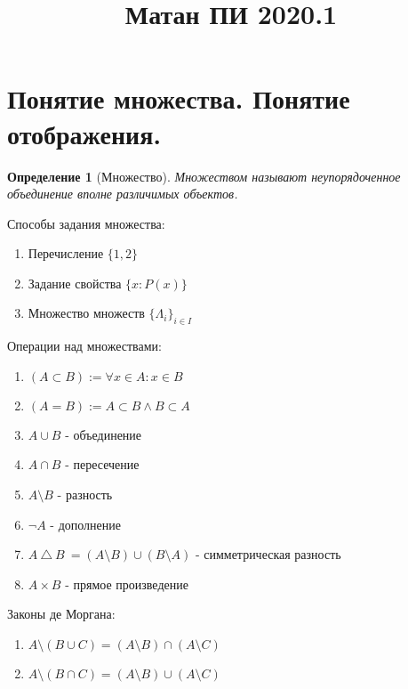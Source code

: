 \documentclass[11pt,a4paper,titlepage]{article}
\title{Матан ПИ 2020.1}
\author{}
\newtheorem*{definition}{Определение}
\begin{document}
    \onehalfspacing

    \maketitle
    \tableofcontents


    \section{Понятие множества. Понятие отображения.}

    \begin{definition}[Множество]
        Множеством называют неупорядоченное объединение вполне различимых объектов.
    \end{definition}

    \bigskip

    Способы задания множества:
    \begin{enumerate}
        \item Перечисление \(\{1, 2\}\)
        \item Задание свойства \(\{x : P(x)\}\)
        \item Множество множеств \(\{\Lambda_i\}_{i \in I}\)
    \end{enumerate}

    \bigskip

    Операции над множествами:
    \begin{enumerate}
        \item \((A \subset B) := \forall x \in A : x \in B \)
        \item \((A = B) := A \subset B \land B \subset A\)
        \item \(A \cup B\) - объединение
        \item \(A \cap B\) - пересечение
        \item \(A \setminus B\) - разность
        \item \(\neg A\) - дополнение
        \item \(A \  \triangle \  B\ = (A \setminus B) \cup (B \setminus A) \) - симметрическая разность
        \item \(A \times B\) - прямое произведение
    \end{enumerate}

    \bigskip

    Законы де Моргана:
    \begin{enumerate}
        \item \(A \setminus (B \cup C) = (A \setminus B) \cap (A \setminus C)\)
        \item \(A \setminus (B \cap C) = (A \setminus B) \cup (A \setminus C)\)
    \end{enumerate}
\end{document}
